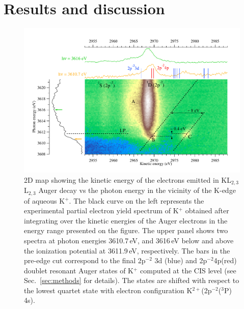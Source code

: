 \section{Results and discussion}\label{sec:rnd}

\begin{figure}%
\centering
\includegraphics[scale=0.55]{figures/k_2dmap.pdf}
\caption{2D map showing the kinetic energy of the electrons emitted in KL$_{2,3}$L$_{2,3}$ Auger decay vs the photon energy in the vicinity of the K-edge of aqueous K$^{+}$. The black curve on the left represents the experimental partial electron yield spectrum of K$^{+}$ obtained after integrating over the kinetic energies of the Auger electrons in the energy range presented on the figure. The upper panel shows two spectra at photon energies 3610.7\,eV, and 3616\,eV below and above the ionization potential at 3611.9\,eV, respectively. The bars in the pre-edge cut correspond to the final 2p$^{-2}$ 3d (blue) and 2p$^{-2}$4p(red) doublet resonant Auger states of K$^{+}$ computed at the CIS level (see Sec.\ \ref{sec:methods} for details). The states are shifted with respect to the lowest quartet state with electron configuration K$^{2+}$(2p$^{-2}$($^3$P) 4s).}
\label{fg:2dmap_k}
\end{figure}


